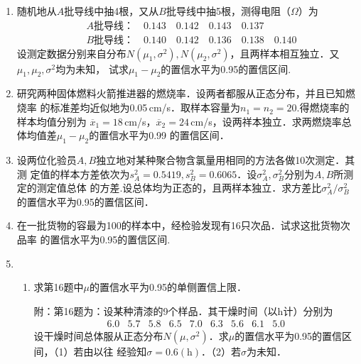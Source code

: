 \documentclass[10pt,a4paper]{article}
\begin{document}
\begin{enumerate}
    \item 随机地从$A$批导线中抽4根，又从$B$批导线中抽5根，测得电阻（$\Omega$）为
    \begin{equation}
        \begin{split}
            & A\mbox{批导线：} \quad  0.143 \quad 0.142 \quad 0.143 \quad 0.137\\
            & B\mbox{批导线：} \quad  0.140 \quad 0.142 \quad 0.136 \quad 0.138 \quad 0.140
        \end{split}
        \nonumber
    \end{equation}
    设测定数据分别来自分布$N(\mu_1,\sigma^2),N(\mu_2,\sigma^2)$，且两样本相互独立．又$\mu_1,\mu_2,\sigma^2$均为未知，
    试求$\mu_1-\mu_2$的置信水平为0.95的置信区间.




    \item 研究两种固体燃料火箭推进器的燃烧率．设两者都服从正态分布，并且已知燃烧率
    的标准差均近似地为0.05$\, $cm/s．取样本容量为$n_1=n_2=20$.得燃烧率的样本均值分别为
    $\overline{x}_1=18\, $cm/s，$\overline{x}_2=24\, $cm/s，设两祥本独立．求两燃烧率总体均值差$\mu_1-\mu_2$的置信水平为0.99
    的置信区间．




    \item 设两位化验员$A, B$独立地对某种聚合物含氯量用相同的方法各做10次测定．其测
    定值的样本方差依次为$s_A^2=0.5419,s_B^2=0.6065$．设$\sigma_A^2,\sigma_B^2$分别为$A,B$所测定的测定值总体
    的方差.设总体均为正态的，且两样本独立．求方差比$\sigma_A^2/\sigma_B^2$的置信水平为0.95的置信区间．


    \item 在一批货物的容最为100的样本中，经检验发现有16只次品．试求这批货物次品率
    的置信水平为0.95的置信区间.




    \item \begin{enumerate}
        \item 求第16题中$\mu$的置信水平为0.95的单侧置信上限．
        
        {\kaishu 附：第16题为：设某种清漆的9个样品．其干燥时间（以h计）分别为
        $$\begin{array}{ccccccccc}
            6.0 & 5.7 & 5.8 & 6.5 & 7.0 & 6.3 & 5.6 & 6.1 & 5.0
        \end{array}$$
        设干燥时间总体服从正态分布$N(\mu,\sigma^2)$．求$\mu$的置信水平为0.95的置信区间，（1）若由以往
        经验知$\sigma=0.6(\mathrm{h})$．（2）若$\sigma$为未知．}


\end{enumerate}
\end{enumerate}
\end{document}
